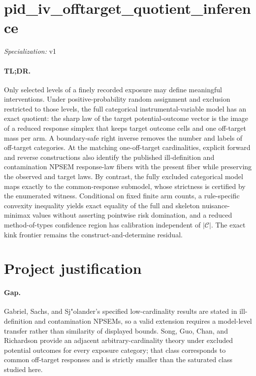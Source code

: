 \documentclass{article}
\begin{document}
\sloppy

\section*{pid\_\allowbreak{}iv\_\allowbreak{}offtarget\_\allowbreak{}quotient\_\allowbreak{}inference}

\noindent\textit{Specialization:} v1\par

\paragraph{TL;DR.} Only selected levels of a finely recorded exposure may define meaningful interventions.  Under positive-probability random assignment and exclusion restricted to those levels, the full categorical instrumental-variable model has an exact quotient: the sharp law of the target potential-outcome vector is the image of a reduced response simplex that keeps target outcome cells and one off-target mass per arm.  A boundary-safe right inverse removes the number and labels of off-target categories.  At the matching one-off-target cardinalities, explicit forward and reverse constructions also identify the published ill-definition and contamination NPSEM response-law fibers with the present fiber while preserving the observed and target laws.  By contrast, the fully excluded categorical model maps exactly to the common-response submodel, whose strictness is certified by the enumerated witness.  Conditional on fixed finite arm counts, a rule-specific convexity inequality yields exact equality of the full and skeleton nuisance-minimax values without asserting pointwise risk domination, and a reduced method-of-types confidence region has calibration independent of \( |\mathcal C| \).  The exact kink frontier remains the construct-and-determine residual.

\section{Project justification}

\paragraph{Gap.} Gabriel, Sachs, and Sj"olander's specified low-cardinality results are stated in ill-definition and contamination NPSEMs, so a valid extension requires a model-level transfer rather than similarity of displayed bounds.  Song, Guo, Chan, and Richardson provide an adjacent arbitrary-cardinality theory under excluded potential outcomes for every exposure category; that class corresponds to common off-target responses and is strictly smaller than the saturated class studied here.
\end{document}
